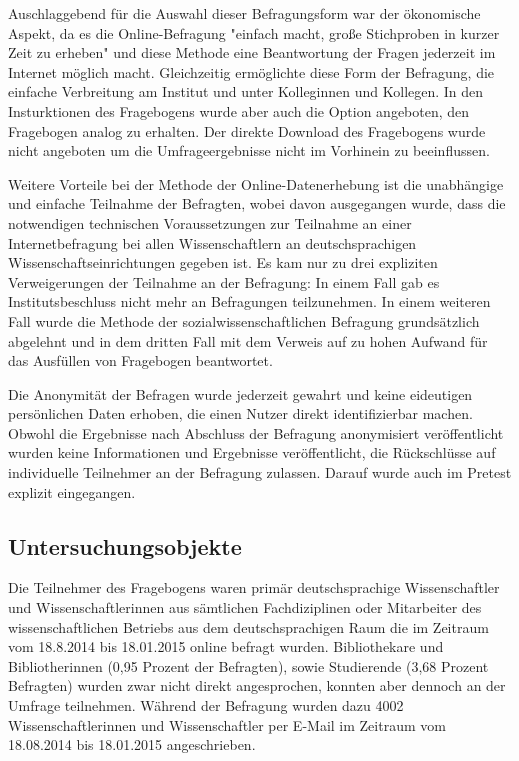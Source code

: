 Auschlaggebend für die Auswahl dieser Befragungsform war der ökonomische Aspekt, da es die Online-Befragung "einfach macht, große Stichproben in kurzer Zeit zu erheben" \cite{eichhorn_2004_online} und diese Methode eine Beantwortung der Fragen jederzeit im Internet möglich macht. Gleichzeitig ermöglichte diese Form der Befragung, die einfache Verbreitung am Institut und unter Kolleginnen und Kollegen. In den Insturktionen des Fragebogens wurde aber auch die Option angeboten, den Fragebogen analog zu erhalten. Der direkte Download des Fragebogens wurde nicht angeboten um die Umfrageergebnisse nicht im Vorhinein zu beeinflussen. 

Weitere Vorteile bei der Methode der Online-Datenerhebung ist die unabhängige und einfache Teilnahme der Befragten, wobei davon ausgegangen wurde, dass die notwendigen technischen Voraussetzungen zur Teilnahme an einer Internetbefragung bei allen Wissenschaftlern an deutschsprachigen Wissenschaftseinrichtungen gegeben ist. Es kam nur zu drei expliziten Verweigerungen der Teilnahme an der Befragung: In einem Fall gab es Institutsbeschluss nicht mehr an Befragungen teilzunehmen. In einem weiteren Fall wurde die Methode der sozialwissenschaftlichen Befragung grundsätzlich abgelehnt und in dem dritten Fall mit dem Verweis auf zu hohen Aufwand für das Ausfüllen von Fragebogen beantwortet.

Die Anonymität der Befragen wurde jederzeit gewahrt und keine eideutigen persönlichen Daten erhoben, die einen Nutzer direkt identifizierbar machen. Obwohl die Ergebnisse nach Abschluss der Befragung anonymisiert veröffentlicht wurden keine Informationen und Ergebnisse veröffentlicht, die Rückschlüsse auf individuelle Teilnehmer an der Befragung zulassen. Darauf wurde auch im Pretest explizit eingegangen.

\subsection{Untersuchungsobjekte}

Die Teilnehmer des Fragebogens waren primär deutschsprachige Wissenschaftler und Wissenschaftlerinnen aus sämtlichen Fachdiziplinen oder Mitarbeiter des wissenschaftlichen Betriebs aus dem deutschsprachigen Raum die im Zeitraum vom 18.8.2014 bis 18.01.2015 online befragt wurden. Bibliothekare und Bibliotherinnen (0,95 Prozent der Befragten), sowie Studierende (3,68 Prozent Befragten) wurden zwar nicht direkt angesprochen, konnten aber dennoch an der Umfrage teilnehmen. Während der Befragung wurden dazu 4002 Wissenschaftlerinnen und Wissenschaftler per E-Mail im Zeitraum vom 18.08.2014 bis 18.01.2015 angeschrieben.

